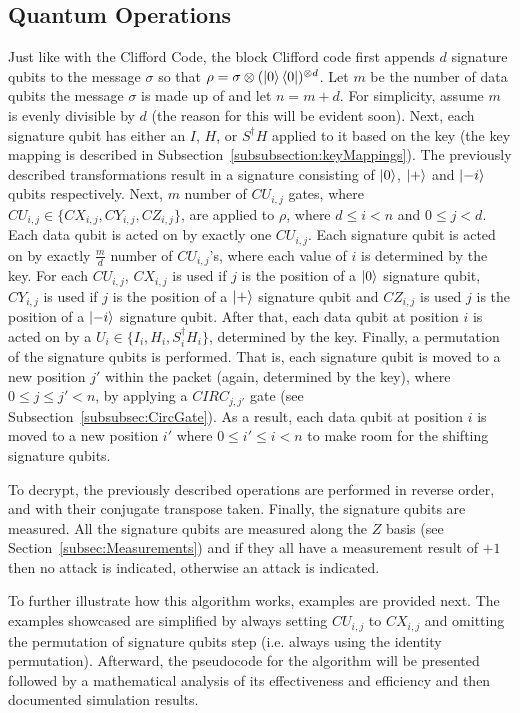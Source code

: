 \subsection{Quantum Operations}
Just like with the Clifford Code, the block Clifford code first appends $d$ signature qubits to the message $\sigma$ so that $\rho = \sigma \otimes (\ket{0}\bra{0})^{\otimes d}$. Let $m$ be the number of data qubits the message $\sigma$ is made up of and let $n = m + d$. For simplicity, assume $m$ is evenly divisible by $d$ (the reason for this will be evident soon). Next, each signature qubit has either an $I$, $H$, or $S^{\dagger}H$ applied to it based on the key (the key mapping is described in Subsection~\ref{subsubsection:keyMappings}). The previously described transformations result in a signature consisting of $\ket{0}$, $\ket{+}$ and $\ket{-i}$ qubits respectively. Next, $m$ number of $\mathit{CU}_{i,j}$ gates, where $\mathit{CU}_{i,j} \in \{\mathit{CX}_{i,j}, \mathit{CY}_{i,j}, \mathit{CZ}_{i,j}\}$, are applied to $\rho$, where $d \leq i < n$ and $0 \leq j < d$. Each data qubit is acted on by exactly one $\mathit{CU}_{i,j}$. Each signature qubit is acted on by exactly $\frac{m}{d}$ number of $\mathit{CU}_{i,j}$'s, where each value of $i$ is determined by the key. For each $\mathit{CU}_{i,j}$, $\mathit{CX}_{i,j}$ is used if $j$ is the position of a $\ket{0}$ signature qubit, $\mathit{CY}_{i,j}$ is used if $j$ is the position of a $\ket{+}$ signature qubit and $\mathit{CZ}_{i,j}$ is used $j$ is the position of a $\ket{-i}$ signature qubit. After that, each data qubit at position $i$ is acted on by a $U_i \in \{I_i,H_i,S_i^{\dagger}H_i\}$, determined by the key. Finally, a permutation of the signature qubits is performed. That is, each signature qubit is moved to a new position $j'$ within the packet (again, determined by the key), where $0 \leq j \leq j' < n$,  by applying a $\mathit{CIRC}_{j,j'}$ gate (see Subsection~\ref{subsubsec:CircGate}). As a result, each data qubit at position $i$ is moved to a new position $i'$ where $0 \leq i' \leq i < n$ to make room for the shifting signature qubits.
 
To decrypt, the previously described operations are performed in reverse order, and with their conjugate transpose taken. Finally, the signature qubits are measured. All the signature qubits are measured along the $Z$ basis (see Section~\ref{subsec:Measurements}) and if they all have a measurement result of $+1$ then no attack is indicated, otherwise an attack is indicated.

To further illustrate how this algorithm works, examples are provided next. The examples showcased are simplified by always setting $\mathit{CU}_{i,j}$ to $\mathit{CX}_{i,j}$ and omitting the permutation of signature qubits step (i.e. always using the identity permutation). Afterward, the pseudocode for the algorithm will be presented followed by a mathematical analysis of its effectiveness and efficiency and then documented simulation results.

